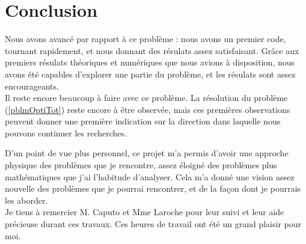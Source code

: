 \documentclass{article}
\begin{document}
\section*{Conclusion}
Nous avons avancé par rapport à ce problème : nous avons un premier code, tournant rapidement, et nous donnant des résulats assez satisfaisant. Grâce aux premiers résulats théoriques et numériques que nous avions à disposition, nous avons été capables d'explorer une partie du problème, et les résulats sont assez encourageants.\\
Il reste encore beaucoup à faire avec ce problème. La résolution du problème (\ref{pblmOptiTot}) reste encore à être observée, mais ces premières observations peuvent donner une première indication sur la direction dans laquelle nous pouvons continuer les recherches.

\bigskip
D'un point de vue plus personnel, ce projet m'a permis d'avoir une approche physique des problèmes que je rencontre, assez éloigné des problèmes plus mathématiques que j'ai l'habitude d'analyser. Cela m'a donné une vision assez nouvelle des problèmes que je pourrai rencontrer, et de la façon dont je pourrais les aborder.\\
Je tiens à remercier M. Caputo et Mme Laroche pour leur suivi et leur aide précieuse durant ces travaux. Ces heures de travail ont été un grand plaisir pour moi.



\end{document}
